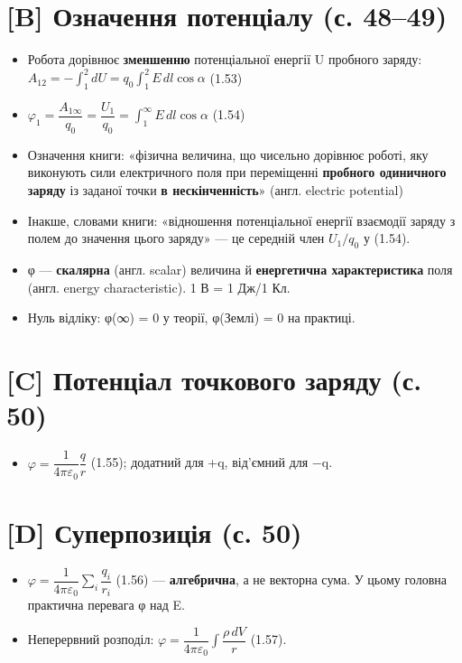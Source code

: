\documentclass[11pt,a4paper,oneside]{book}
\begin{document}
\section*{[B] Означення потенціалу (с. 48–49)}
\begin{itemize}
\item Робота дорівнює \textbf{зменшенню} потенціальної енергії U пробного заряду: $A_{12} = -\int_1^2 dU = q_0\int_1^2 E\,dl\cos\alpha$ (1.53)
\item $\varphi_1 = \dfrac{A_{1\infty}}{q_0} = \dfrac{U_1}{q_0} = \int_1^\infty E\,dl\cos\alpha$ (1.54)
\item Означення книги: «фізична величина, що чисельно дорівнює роботі, яку виконують сили електричного поля при переміщенні \textbf{пробного одиничного заряду} із заданої точки \textbf{в нескінченність}» (англ. electric potential)
\item Інакше, словами книги: «відношення потенціальної енергії взаємодії заряду з полем до значення цього заряду» — це середній член $U_1/q_0$ у (1.54).
\item φ — \textbf{скалярна} (англ. scalar) величина й \textbf{енергетична характеристика} поля (англ. energy characteristic). 1 В = 1 Дж/1 Кл.
\item Нуль відліку: φ(∞) = 0 у теорії, φ(Землі) = 0 на практиці.
\end{itemize}

\section*{[C] Потенціал точкового заряду (с. 50)}
\begin{itemize}
\item $\varphi = \dfrac{1}{4\pi\varepsilon_0}\dfrac{q}{r}$ (1.55); додатний для +q, від'ємний для −q.
\end{itemize}

\section*{[D] Суперпозиція (с. 50)}
\begin{itemize}
\item $\varphi = \dfrac{1}{4\pi\varepsilon_0}\sum_i \dfrac{q_i}{r_i}$ (1.56) — \textbf{алгебрична}, а не векторна сума. У цьому головна практична перевага φ над E.
\item Неперервний розподіл: $\varphi = \dfrac{1}{4\pi\varepsilon_0}\int \dfrac{\rho\,dV}{r}$ (1.57).
\end{itemize}
\end{document}
